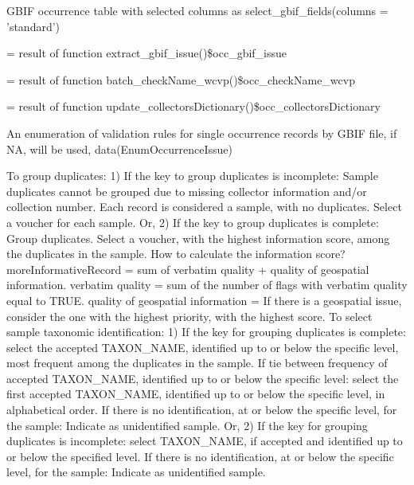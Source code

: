 \documentclass[a4paper]{book}
\begin{document}
\begin{Arguments}
\begin{ldescription}
\item[\code{occ}] GBIF occurrence table with selected columns as select\_gbif\_fields(columns = 'standard')

\item[\code{occ\_gbif\_issue}] = result of function extract\_gbif\_issue()\$occ\_gbif\_issue

\item[\code{occ\_checkName\_wcvp}] = result of function batch\_checkName\_wcvp()\$occ\_checkName\_wcvp

\item[\code{occ\_collectorsDictionary}] = result of function update\_collectorsDictionary()\$occ\_collectorsDictionary

\item[\code{enumOccurrenceIssue}] An enumeration of validation rules for single occurrence records by GBIF file, if NA, will be used, data(EnumOccurrenceIssue)
\end{ldescription}
\end{Arguments}
%
\begin{Details}
To group duplicates: 1) If the key to group duplicates is incomplete: Sample duplicates cannot be grouped due to missing collector information and/or collection number. Each record is considered a sample, with no duplicates. Select a voucher for each sample.
Or, 2) If the key to group duplicates is complete: Group duplicates. Select a voucher, with the highest information score, among the duplicates in the sample.
How to calculate the information score?
moreInformativeRecord = sum of verbatim quality + quality of geospatial information. verbatim quality = sum of the number of flags with verbatim quality equal to TRUE. quality of geospatial information = If there is a geospatial issue, consider the one with the highest priority, with the highest score.
To select sample taxonomic identification: 1) If the key for grouping duplicates is complete: select the accepted TAXON\_NAME, identified up to or below the specific level, most frequent among the duplicates in the sample. If tie between frequency of accepted TAXON\_NAME, identified up to or below the specific level: select the first accepted TAXON\_NAME, identified up to or below the specific level, in alphabetical order. If there is no identification, at or below the specific level, for the sample: Indicate as unidentified sample.
Or, 2) If the key for grouping duplicates is incomplete: select TAXON\_NAME, if accepted and identified up to or below the specified level. If there is no identification, at or below the specific level, for the sample: Indicate as unidentified sample.
\end{Details}
\end{document}
